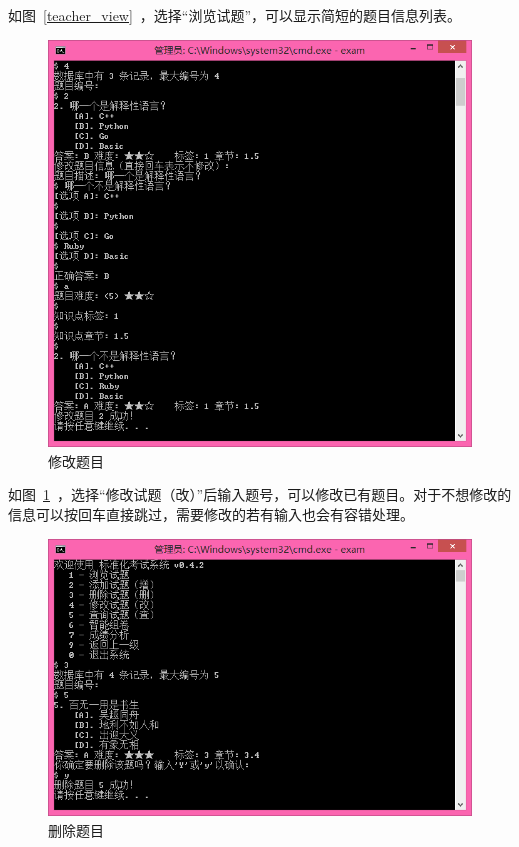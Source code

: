 如图~\ref{teacher_view}~，选择“浏览试题”，可以显示简短的题目信息列表。

\begin{figure}[htp]
\includegraphics[width=\textwidth]{image/teacher_update.png}
\caption{\label{teacher_update}修改题目}
\end{figure}

如图~\ref{teacher_update}~，选择“修改试题（改）”后输入题号，可以修改已有题目。对于不想修改的信息可以按回车直接跳过，需要修改的若有输入也会有容错处理。

\begin{figure}[htp]
\includegraphics[width=\textwidth]{image/teacher_delete.png}
\caption{\label{teacher_delete}删除题目}
\end{figure}

